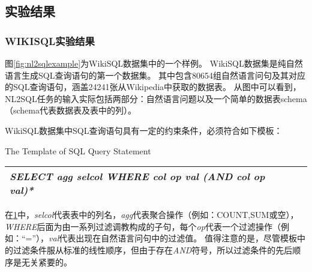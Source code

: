 \subsection{实验结果}
\subsubsection{WIKISQL实验结果}

图\ref{fig:nl2sqlexample}为WikiSQL数据集\cite{zhong2017seq2sql}中的一个样例。
WikiSQL数据集是纯自然语言生成SQL查询语句的第一个数据集。
其中包含80654组自然语言问句及其对应的SQL查询语句，涵盖24241张从Wikipedia中获取的数据表。
从图中可以看到，NL2SQL任务的输入实际包括两部分：自然语言问题以及一个简单的数据表schema（schema代表数据表及表中的列）。

WikiSQL数据集中SQL查询语句具有一定的约束条件，必须符合如下模板：

\begin{table}[!hpb]
    \centering
      {The Template of SQL Query Statement}
    \label{nli:sqlmb}
    \begin{tabular}{@{}llr@{}} \toprule
    \emph{SELECT   agg   selcol   WHERE   col   op   val   (AND   col   op   val)*}\\\bottomrule
  
    \end{tabular}
  \end{table}

  在\ref{nli:sqlmb}中，\emph{selcol}代表表中的列名，\emph{agg}代表聚合操作（例如：COUNT,SUM或空），
  \emph{WHERE}后面为由一系列过滤调教构成的子句，每个\emph{op}代表一个过滤操作（例如：“=”），\emph{val}代表出现在自然语言问句中的过滤值。
  值得注意的是，尽管模板中的过滤条件服从标准的线性顺序，但由于存在\emph{AND}符号，所以过滤条件的先后顺序是无关紧要的。

